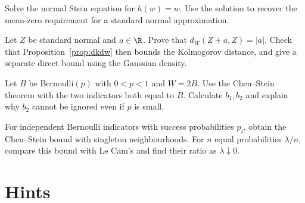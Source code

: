 \begin{exercise}[$\star$]\label{ex:v11-ch06-linear}
Solve the normal Stein equation for $h(w)=w$. Use the solution to recover the mean-zero requirement for a standard normal approximation.
\end{exercise}

\begin{exercise}[$\star\star$]\label{ex:v11-ch06-shift}
Let $Z$ be standard normal and $a\in\R$. Prove that $d_W(Z+a,Z)=|a|$. Check that Proposition~\ref{prop:dkdw} then bounds the Kolmogorov distance, and give a separate direct bound using the Gaussian density.
\end{exercise}

\begin{exercise}[$\star\star$]\label{ex:v11-ch06-clump}
Let $B$ be Bernoulli$(p)$ with $0<p<1$ and $W=2B$. Use the Chen--Stein theorem with the two indicators both equal to $B$. Calculate $b_1,b_2$ and explain why $b_2$ cannot be ignored even if $p$ is small.
\end{exercise}

\begin{exercise}[$\star\star$]\label{ex:v11-ch06-independent}
For independent Bernoulli indicators with success probabilities $p_i$, obtain the Chen--Stein bound with singleton neighbourhoods. For $n$ equal probabilities $\lambda/n$, compare this bound with Le Cam's and find their ratio as $\lambda\downarrow0$.
\end{exercise}

\section{Hints}

